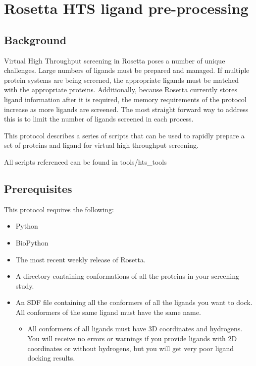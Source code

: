 \chapter{Rosetta HTS ligand pre-processing}

\section{Background}

Virtual High Throughput screening in Rosetta poses a number of unique challenges.
Large numbers of ligands must be prepared and managed.
If multiple protein systems are being screened, the appropriate ligands must be matched with the appropriate proteins. 
Additionally, because Rosetta currently stores ligand information after it is required, the memory requirements of the protocol increase as more ligands are screened.
The most straight forward way to address this is to limit the number of ligands screened in each process.

This protocol describes a series of scripts that can be used to rapidly prepare a set of proteins and ligand for virtual high throughput screening.

All scripts referenced can be found in tools/hts\_tools

\section{Prerequisites}

This protocol requires the following:

\begin{itemize}
\itemsep1pt\parskip0pt
\item Python
\item BioPython
\item The most recent weekly release of Rosetta.
\item A directory containing conformations of all the proteins in your screening study.
\item An SDF file containing all the conformers of all the ligands you want to dock. All conformers of the same ligand must have the same name.
	\begin{itemize}
	\itemsep1pt\parskip0pt
	\item All conformers of all ligands must have 3D coordinates and hydrogens.
	You will receive no errors or warnings if you provide ligands with 2D coordinates or without hydrogens, but you will get very poor ligand docking results.
	\end{itemize}
\end{itemize}

